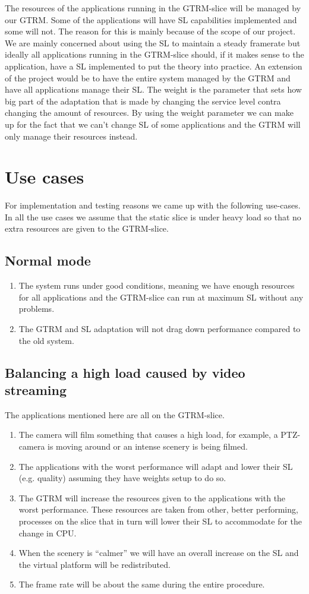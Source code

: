 \documentclass{LTHthesis}
\begin{document}
The resources of the applications running in the GTRM-slice will be managed by our GTRM. Some of the applications will have SL capabilities implemented and some will not. The reason for this is mainly because of the scope of our project. We are mainly concerned about using the SL to maintain a steady framerate but ideally all applications running in the GTRM-slice should, if it makes sense to the application, have a SL implemented to put the theory into practice. An extension of the project would be to have the entire system managed by the GTRM and have all applications manage their SL. The weight is the parameter that sets how big part of the adaptation that is made by changing the service level contra changing the amount of resources. By using the weight parameter we can make up for the fact that we can’t change SL of some applications and the GTRM will only manage their resources instead. 

\chapter{Use cases}
For implementation and testing reasons we came up with the following use-cases. In all the use cases we assume that the static slice is under heavy load so that no extra resources are given to the GTRM-slice. 
\section{Normal mode}
\begin{enumerate}
\item The system runs under good conditions, meaning we have enough resources for all applications and the GTRM-slice can run at maximum SL without any problems.
\item The GTRM and SL adaptation will not drag down performance compared to the old system.
\end{enumerate}
\section{Balancing a high load caused by video streaming}
The applications mentioned here are all on the GTRM-slice.

\begin{enumerate}
\item The camera will film something that causes a high load, for example, a PTZ-camera is moving around or an intense scenery is being filmed.
\item The applications with the worst performance  will adapt and lower their SL (e.g. quality) assuming they have weights setup to do so.
\item The GTRM will increase the resources given to the applications with the worst performance. These resources are taken from other, better performing,  processes on the slice that in turn will lower their SL to accommodate for the change in CPU.
\item When the scenery is “calmer” we will have an overall increase on the SL and the virtual platform will be redistributed.
\item The frame rate will be about the same during the entire procedure.
\end{enumerate}
\end{document}

